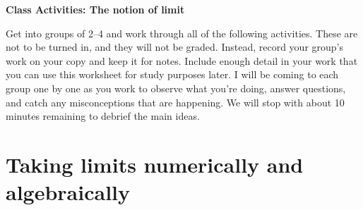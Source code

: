 \documentclass[11pt]{article}
\begin{document}
	
	\thispagestyle{empty}
	\renewcommand{\headrulewidth}{0.0pt}
	\thispagestyle{fancy}
	\lfoot{}
	\cfoot{}
	\rfoot{}	
	
	\vspace*{0in}

		\begin{center}
			\begin{large}
			\textbf{Class Activities: The notion of limit} \\
			\end{large}
		\end{center}
	
Get into groups of 2--4 and work through all of the following activities. These are not to be turned in, and they will not be graded. Instead, record your group's work on your copy and keep it for notes. Include enough detail in your work that you can use this worksheet for study purposes later. I will be coming to each group one by one as you work to observe what you're doing, answer questions, and catch any misconceptions that are happening. We will stop with about 10 minutes remaining to debrief the main ideas. 


\section{Taking limits numerically and algebraically}
\end{document}
